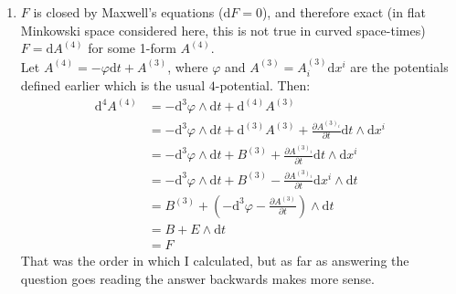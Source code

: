 \documentclass[12pt,a4]{article}
\newcommand{\e}{\mathrm{d}}
\begin{document}
\begin{enumerate}
\begin{enumerate}
%
      \item
        $F$ is closed by Maxwell's equations ($\e F = 0$), and therefore exact (in flat Minkowski space considered here, this is not true in curved space-times) $F = \e A^{(4)}$ for some 1-form $A^{(4)}$.\\

        Let $A^{(4)} = - \varphi \e t + A^{(3)}$, where $\varphi$ and $A^{(3)} = A^{(3)}_i \e x^i$ are the potentials defined earlier which is the usual $4$-potential.
        Then:
        \begin{align*}
          \e^{4} A^{(4)} &= - \e^{3} \varphi \wedge \e t + \e^{(4)} A^{(3)}\\
                         &= - \e^{3} \varphi \wedge \e t + \e^{(3)} A^{(3)} + \frac{\partial A^{(3)_i}}{\partial t} \e t \wedge \e x^i\\
                         &= - \e^{3} \varphi \wedge \e t + B^{(3)} + \frac{\partial A^{(3)_i}}{\partial t} \e t \wedge \e x^i\\
                         &= - \e^{3} \varphi \wedge \e t + B^{(3)} - \frac{\partial A^{(3)_i}}{\partial t} \e x^i \wedge \e t\\
                         &=  B^{(3)} + (- \e^{3} \varphi  - \frac{\partial A^{(3)}}{\partial t} ) \wedge \e t\\
                         &= B + E \wedge \e t\\
                         &= F
        \end{align*}
        That was the order in which I calculated, but as far as answering the question goes reading the answer backwards makes more sense.
    \end{enumerate}
\end{enumerate}
\end{document}
